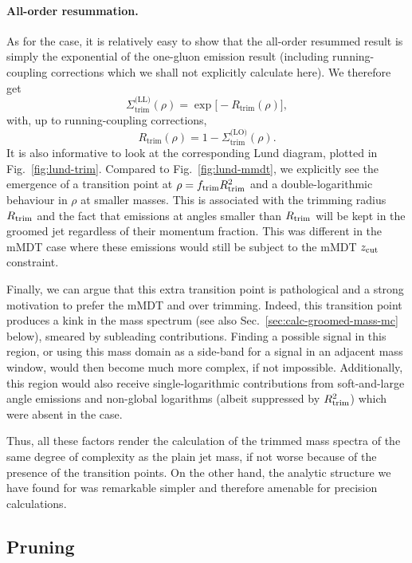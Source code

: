 \paragraph{All-order resummation.} As for the \SD case, it is
relatively easy to show that the all-order resummed result is simply
the exponential of the one-gluon emission result (including
running-coupling corrections which we shall not explicitly calculate
here). We therefore get
\begin{equation}\label{eq:trim-ll}
 \Sigma_{\text{trim}}^{\text{(LL)}}(\rho) = \exp\big[-R_{\text{trim}}(\rho)\big],
\end{equation}
with, up to running-coupling corrections, 
\[
 R_{\text{trim}}(\rho) = 1-\Sigma_{\text{trim}}^{\text{(LO)}}(\rho).
\]
It is also informative to look at the corresponding Lund diagram,
plotted in Fig.~\ref{fig:lund-trim}. Compared to
Fig.~\ref{fig:lund-mmdt}, we explicitly see the emergence of a
transition point at $\rho=f_{\text{trim}}R_{\text{trim}}^2$ and a double-logarithmic
behaviour in $\rho$ at smaller masses. This is associated with the
trimming radius $R_{\text{trim}}$ and the fact that emissions at angles smaller
than $R_{\text{trim}}$ will be kept in the groomed jet regardless of their
momentum fraction. This was different in the mMDT case where these emissions would still be
subject to the mMDT $z_{\text{cut}}$ constraint.

Finally, we can argue that this extra transition point is pathological
and a strong motivation to prefer the mMDT and \SD over trimming. Indeed, this
transition point produces a kink in the mass spectrum (see also
Sec.~\ref{sec:calc-groomed-mass-mc} below), smeared by subleading
contributions. Finding a possible signal in this region, or using this
mass domain as a side-band for a signal in an adjacent mass window,
would then become much more complex, if not impossible.
%
Additionally, this region would also receive single-logarithmic
contributions from soft-and-large angle emissions and non-global
logarithms (albeit suppressed by $R_{\text{trim}}^2$) which were absent in the
\SD case. 

Thus, all these factors render the calculation of the trimmed mass spectra of the same degree of complexity as the plain jet mass, if not worse because of the presence of the transition points. On the other hand, the analytic structure we have found for \SD was remarkable simpler and therefore amenable for precision calculations.

\subsection{Pruning}

